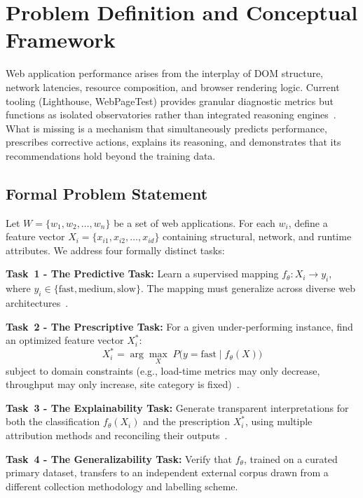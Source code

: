 \documentclass[sn-nature]{sn-jnl}
\begin{document}
\section{Problem Definition and Conceptual Framework}\label{sec3}

Web application performance arises from the interplay of DOM structure, network latencies, resource composition, and browser rendering logic. Current tooling (Lighthouse, WebPageTest) provides granular diagnostic metrics but functions as isolated observatories rather than integrated reasoning engines~\cite{ghattas2025, vanriet2023}. What is missing is a mechanism that simultaneously predicts performance, prescribes corrective actions, explains its reasoning, and demonstrates that its recommendations hold beyond the training data.

\subsection{Formal Problem Statement}

Let $W = \{w_1, w_2, \dots, w_n\}$ be a set of web applications. For each $w_i$, define a feature vector $X_i = \{x_{i1}, x_{i2}, \dots, x_{id}\}$ containing structural, network, and runtime attributes. We address four formally distinct tasks:

\textbf{Task~1 - The Predictive Task:} Learn a supervised mapping $f_\theta : X_i \rightarrow y_i$, where $y_i \in \{\text{fast}, \text{medium}, \text{slow}\}$. The mapping must generalize across diverse web architectures~\cite{ghattas2025, sehwag2024}.

\textbf{Task~2 - The Prescriptive Task:} For a given under-performing instance, find an optimized feature vector $X_i^*$:
\[
X_i^* = \arg\max_{X}\; P\bigl(y = \text{fast} \mid f_\theta(X)\bigr)
\]
subject to domain constraints (e.g., load-time metrics may only decrease, throughput may only increase, site category is fixed)~\cite{notz2024, asha2025}.

\textbf{Task~3 - The Explainability Task:} Generate transparent interpretations for both the classification $f_\theta(X_i)$ and the prescription $X_i^*$, using multiple attribution methods and reconciling their outputs~\cite{salih2024, goldwasser2024}.

\textbf{Task~4 - The Generalizability Task:} Verify that $f_\theta$, trained on a curated primary dataset, transfers to an independent external corpus drawn from a different collection methodology and labelling scheme.
\end{document}
